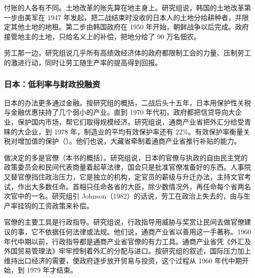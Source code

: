 付账的人各有不同。土地改革的账先算在地主身上。研究组说，韩国的土地改革第一步由美军在 1947 年发起，把二战结束时没收的日本人的土地分给耕种者，并限定其他土地的地租\cite{worldbank1993}。第二步由韩国政府在 1950 年开始，朝鲜战争以后完成\cite{worldbank1993}。政府接管地主的土地，只给名义上的补偿，把地分给了 90 万名佃农\cite{worldbank1993}。

劳工那一边，研究组说几乎所有高绩效经济体的政府都限制工会的力量、压制劳工的激进行动，同时让劳工随生产率的提高得到回报\cite{worldbank1993}。

\subsubsection{日本：低利率与财政投融资}

日本的办法更多通过金融。按研究组的概括，二战后头十五年，日本用保护性关税与金融优惠扶持了几个弱小的产业\cite{worldbank1993}。直到 1970 年代初，政府都把信贷导向大企业，保护国内市场，帮它们取得规模经济\cite{worldbank1993}。研究组说，通商产业省把外汇分给受青睐的大企业，到 1978 年，制造业的平均有效保护率还有 22\%\cite{worldbank1993}。有效保护率衡量关税对增加值的保护（）。他们也说，大藏省牵制着通商产业省推行补贴的能力\cite{worldbank1993}。

做决定的多是官僚（本书的概括）。研究组说，日本的官僚与执政的自由民主党的政策委员会和民间代表商量着起草法律，国会只是批准官僚准备好的东西\cite{worldbank1993}。人事院又替官僚挡住政治压力，它是独立的机构，定官员的薪级与升迁办法，主持文官考试，作出大多数任命\cite{worldbank1993}。首相只任命各省的大臣，除少数情况外，再任命每个省两名次官中的一名\cite{worldbank1993}。研究组引 Johnson（1982）的话说，劳工在政治上失去的，由与生产率挂钩的工资政策来补偿\cite{worldbank1993}。

官僚的主要工具是行政指导。研究组说，行政指导用威胁与奖赏让民间去做官僚建议的事，它不依据任何法律或法规\cite{worldbank1993}。他们说，通商产业省以善用这一手著称\cite{worldbank1993}。1960 年代中期以前，行政指导都是通商产业省官僚的有力工具\cite{worldbank1993}。通商产业省凭《外汇及外国贸易管理法》牢牢控制着外汇的分配与进口\cite{worldbank1993}。按研究组的叙述，国际压力加上维持出口经济的需要，使政府逐步放开贸易与投资，这个过程从 1960 年代中期开始，到 1979 年才结束\cite{worldbank1993}。

